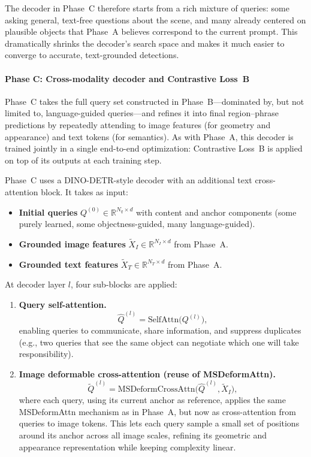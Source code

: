 \begin{enrichment}
\begin{enrichment}[Method][subsection]
		\newpage
		
		The decoder in Phase~C therefore starts from a rich mixture of queries: some asking general, text-free questions about the scene, and many already centered on plausible objects that Phase~A believes correspond to the current prompt. This dramatically shrinks the decoder’s search space and makes it much easier to converge to accurate, text-grounded detections.
		
		\paragraph{Phase C: Cross-modality decoder and Contrastive Loss~B}
		
		Phase~C takes the full query set constructed in Phase~B---dominated by, but not limited to, language-guided queries---and refines it into final region--phrase predictions by repeatedly attending to image features (for geometry and appearance) and text tokens (for semantics). As with Phase~A, this decoder is trained jointly in a single end-to-end optimization: Contrastive Loss~B is applied on top of its outputs at each training step.
		
		Phase~C uses a DINO-DETR-style decoder with an additional text cross-attention block. It takes as input:
		\begin{itemize}
			\item \textbf{Initial queries} \(Q^{(0)} \in \mathbb{R}^{N_q \times d}\) with content and anchor components (some purely learned, some objectness-guided, many language-guided).
			\item \textbf{Grounded image features} \(\tilde{X}_I \in \mathbb{R}^{N_I \times d}\) from Phase~A.
			\item \textbf{Grounded text features} \(\tilde{X}_T \in \mathbb{R}^{N_T \times d}\) from Phase~A.
		\end{itemize}
		
		At decoder layer \(l\), four sub-blocks are applied:
		\begin{enumerate}
			\item \textbf{Query self-attention.}
			\[
			\hat{Q}^{(l)} = \text{SelfAttn}\bigl(Q^{(l)}\bigr),
			\]
			enabling queries to communicate, share information, and suppress duplicates (e.g., two queries that see the same object can negotiate which one will take responsibility).
			
			\item \textbf{Image deformable cross-attention (reuse of MSDeformAttn).}
			\[
			\tilde{Q}^{(l)} = \text{MSDeformCrossAttn}\bigl(\hat{Q}^{(l)}, \tilde{X}_I\bigr),
			\]
			where each query, using its current anchor as reference, applies the same MSDeformAttn mechanism as in Phase~A, but now as cross-attention from queries to image tokens. This lets each query sample a small set of positions around its anchor across all image scales, refining its geometric and appearance representation while keeping complexity linear.
			

\end{enumerate}
\end{enrichment}
\end{enrichment}
